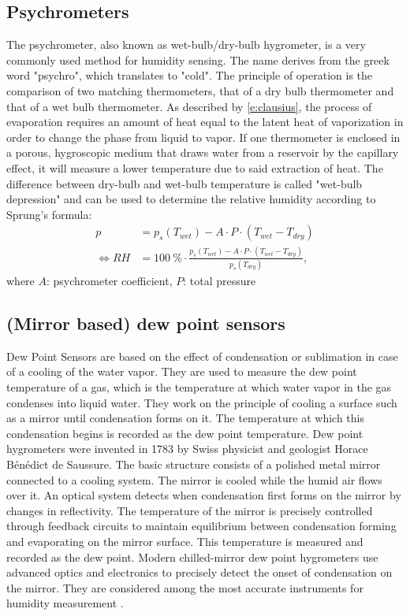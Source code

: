 \subsection{Psychrometers}
The psychrometer, also known as wet-bulb/dry-bulb hygrometer, is a very commonly used method for humidity sensing. The name derives from the greek word "psychro", which translates to "cold". The principle of operation is the comparison of two matching thermometers, that of a dry bulb thermometer and that of a wet bulb thermometer. As described by \cref{e:clausius}, the process of evaporation requires an amount of heat equal to the latent heat of vaporization in order to change the phase from liquid to vapor. If one thermometer is enclosed in a porous, hygroscopic medium that draws water from a reservoir by the capillary effect, it will measure a lower temperature due to said extraction of heat. The difference between dry-bulb and wet-bulb temperature is called "wet-bulb depression" and can be used to determine the relative humidity according to Sprung's formula:
\begin{equation}
    \begin{split}
        p & = p_s(T_{wet}) - A \cdot P \cdot (T_{wet} - T_{dry}) \\
        \iff RH & = \qty{100}{\%} \cdot \frac{p_s(T_{wet}) - A \cdot P \cdot (T_{wet} - T_{dry})}{p_s(T_{dry})},
    \end{split}
\end{equation}
where $A$: psychrometer coefficient, $P$: total pressure

\subsection{(Mirror based) dew point sensors}
Dew Point Sensors are based on the effect of condensation or sublimation in case of a cooling of the water vapor. They are used to measure the dew point temperature of a gas, which is the temperature at which water vapor in the gas condenses into liquid water. They work on the principle of cooling a surface such as a mirror until condensation forms on it. The temperature at which this condensation begins is recorded as the dew point temperature. Dew point hygrometers were invented in 1783 by Swiss physicist and geologist Horace Bénédict de Saussure. The basic structure consists of a polished metal mirror connected to a cooling system. The mirror is cooled while the humid air flows over it. An optical system detects when condensation first forms on the mirror by changes in reflectivity. The temperature of the mirror is precisely controlled through feedback circuits to maintain equilibrium between condensation forming and evaporating on the mirror surface. This temperature is measured and recorded as the dew point. Modern chilled-mirror dew point hygrometers use advanced optics and electronics to precisely detect the onset of condensation on the mirror. They are considered among the most accurate instruments for humidity measurement \autocite{korotcenkovHandbookHumidityMeasurement2019}.

